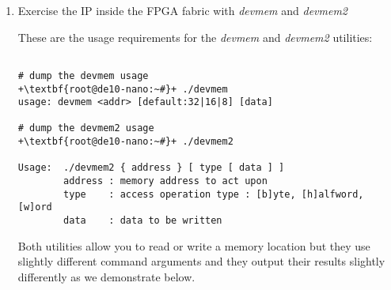 \begin{flushleft}
\begin{enumerate}[
	label=\textbf{Step \arabic*.},
	leftmargin=*,
	widest={00},
	align=left]
\begin{verbatim}

+\textbf{root@de10-nano:~#}+ grep "_BASE" hps_0_arm_a9_0.h | grep -v "HPS_"
#define OCRAM_64K_BASE 0xc0000000
#define LED_PIO_BASE 0xff210000
#define BUTTON_PIO_BASE 0xff210010
#define SWITCH_PIO_BASE 0xff210020
#define SYSTEM_ID_BASE 0xff210030

\end{verbatim}

We will set a number of environment variables to allow us to recall these base addresses easier for the rest of this tutorial.  Execute these commands to setup these variables:

\begin{verbatim}

+\textbf{root@de10-nano:~#}+ export OCRAM_64K_BASE=0xc0000000
+\textbf{root@de10-nano:~#}+ export LED_PIO_BASE=0xff210000
+\textbf{root@de10-nano:~#}+ export BUTTON_PIO_BASE=0xff210010
+\textbf{root@de10-nano:~#}+ export SWITCH_PIO_BASE=0xff210020
+\textbf{root@de10-nano:~#}+ export SYSTEM_ID_BASE=0xff210030

\end{verbatim}

\item Exercise the IP inside the FPGA fabric with \emph{devmem} and \emph{devmem2}

These are the usage requirements for the \emph{devmem} and \emph{devmem2} utilities:

\begin{verbatim}

# dump the devmem usage
+\textbf{root@de10-nano:~#}+ ./devmem
usage: devmem <addr> [default:32|16|8] [data]

# dump the devmem2 usage
+\textbf{root@de10-nano:~#}+ ./devmem2

Usage:  ./devmem2 { address } [ type [ data ] ]
        address : memory address to act upon
        type    : access operation type : [b]yte, [h]alfword, [w]ord
        data    : data to be written

\end{verbatim}

Both utilities allow you to read or write a memory location but they use slightly different command arguments and they output their results slightly differently as we demonstrate below.


\end{enumerate}
\end{flushleft}
